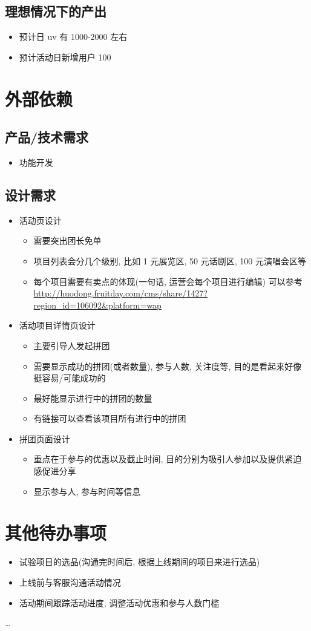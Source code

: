 \documentclass[11pt,a4paper]{article}
\begin{document}
\subsection{理想情况下的产出}
\label{sec:org405fc37}
\begin{itemize}
\item 预计日 uv 有 1000-2000 左右
\item 预计活动日新增用户 100
\end{itemize}

\section{外部依赖}
\label{sec:orgd7e73ab}
\subsection{产品/技术需求}
\label{sec:org2ba0067}
\begin{itemize}
\item 功能开发
\end{itemize}

\subsection{设计需求}
\label{sec:orgdbcd0e7}
\begin{itemize}
\item 活动页设计
\begin{itemize}
\item 需要突出团长免单
\item 项目列表会分几个级别, 比如 1 元展览区, 50 元话剧区, 100 元演唱会区等
\item 每个项目需要有卖点的体现(一句话, 运营会每个项目进行编辑) 可以参考 \url{http://huodong.fruitday.com/cms/share/1427?region\_id=106092\&platform=wap}
\end{itemize}
\item 活动项目详情页设计
\begin{itemize}
\item 主要引导人发起拼团
\item 需要显示成功的拼团(或者数量), 参与人数, 关注度等, 目的是看起来好像挺容易/可能成功的
\item 最好能显示进行中的拼团的数量
\item 有链接可以查看该项目所有进行中的拼团
\end{itemize}
\item 拼团页面设计
\begin{itemize}
\item 重点在于参与的优惠以及截止时间, 目的分别为吸引人参加以及提供紧迫感促进分享
\item 显示参与人, 参与时间等信息
\end{itemize}
\end{itemize}

\section{其他待办事项}
\label{sec:orgf92350c}
\begin{itemize}
\item 试验项目的选品(沟通完时间后, 根据上线期间的项目来进行选品)

\item 上线前与客服沟通活动情况

\item 活动期间跟踪活动进度, 调整活动优惠和参与人数门槛
\end{itemize}

\ldots{}
\end{document}
